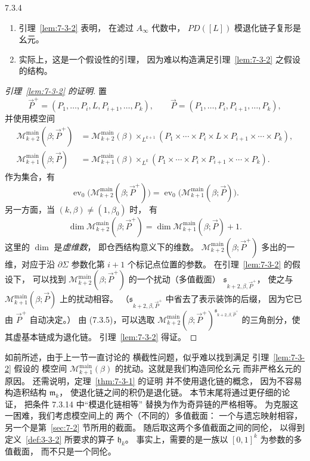 \begin{samepage}
\begin{remark}{7.3.4}\label{rem:7-3-4}
\begin{enumerate}[label=\textup{(\arabic*)},leftmargin=2.8em]
\item 引理~\ref{lem:7-3-2} 表明，
在滤过 $A_\infty$ 代数中，
$PD([L])$ 模退化链子复形是幺元。
\item 实际上，这是一个假设性的引理，
因为难以构造满足引理~\ref{lem:7-3-2}
之假设的结构。
\end{enumerate}
\end{remark}
\end{samepage}

\begin{proof}[引理~\ref{lem:7-3-2} 的证明]
置
\[
\vec P^+=(P_1,\ldots,P_i,L,P_{i+1},\ldots,P_k),
\qquad
\vec P=(P_1,\ldots,P_i,P_{i+1},\ldots,P_k),
\]
并使用模空间
\[
\begin{aligned}
\mathcal M^{\mathrm{main}}_{k+2}(\beta;\vec P^+)
&=\mathcal M^{\mathrm{main}}_{k+2}(\beta)
\mathbin{\times_{L^{k+1}}}
(P_1\times\cdots\times P_i\times L
\times P_{i+1}\times\cdots\times P_k),\\
\mathcal M^{\mathrm{main}}_{k+1}(\beta;\vec P)
&=\mathcal M^{\mathrm{main}}_{k+1}(\beta)
\mathbin{\times_{L^k}}
(P_1\times\cdots\times P_i
\times P_{i+1}\times\cdots\times P_k).
\end{aligned}
\]
作为集合，有
\[
\operatorname{ev}_0
\bigl(\mathcal M^{\mathrm{main}}_{k+2}
(\beta;\vec P^+)\bigr)
=\operatorname{ev}_0
\bigl(\mathcal M^{\mathrm{main}}_{k+1}
(\beta;\vec P)\bigr).
\]
另一方面，当 $(k,\beta)\ne(1,\beta_0)$ 时，
有
\begin{equation}
\dim\mathcal M^{\mathrm{main}}_{k+2}(\beta;\vec P^+)
=\dim\mathcal M^{\mathrm{main}}_{k+1}(\beta;\vec P)+1.
\tag{7.3.5}\label{eq:7-3-5}
\end{equation}
这里的 $\dim$ 是\emph{虚维数}，
即仓西结构意义下的维数。
$\mathcal M^{\mathrm{main}}_{k+2}(\beta;\vec P^+)$
多出的一维，对应于沿 $\partial\Sigma$
参数化第 $i+1$ 个标记点位置的参数。
在引理~\ref{lem:7-3-2} 的假设下，
可以找到
$\mathcal M^{\mathrm{main}}_{k+2}(\beta;\vec P^+)$
的一个扰动（多值截面）
$\mathfrak s_{k+2,\beta,\vec P^+}$，
使之与
$\mathcal M^{\mathrm{main}}_{k+1}(\beta;\vec P)$
上的扰动相容。
（$\mathfrak s_{k+2,\beta,\vec P^+}$
中省去了表示装饰的后缀，
因为它已由 $\vec P^+$ 自动决定。）
由 (7.3.5)，可以选取
$\mathcal M^{\mathrm{main}}_{k+2}
(\beta;\vec P^+)^{\mathfrak s_{k+2,\beta,\vec P^+}}$
的三角剖分，使其虚基本链成为退化链。
引理~\ref{lem:7-3-2} 得证。
\end{proof}

如前所述，由于上一节一直讨论的
横截性问题，似乎难以找到满足
引理~\ref{lem:7-3-2} 假设的
模空间 $\mathcal M^{\mathrm{main}}_{k+1}(\beta)$
的扰动。这就是我们构造同伦幺元
而非严格幺元的原因。
还需说明，定理~\ref{thm:7-3-1} 的证明
并不使用退化链的概念，
因为不容易构造积结构 $\mathfrak m_k$，
使退化链之间的积仍是退化链。
本节末尾将通过更仔细的论证，
把条件 7.3.14 中“模退化链相等”
替换为作为奇异链的严格相等。
为克服这一困难，我们考虑模空间上的
两个（不同的）多值截面：
一个与遗忘映射相容，
另一个是第~\ref{sec:7-2} 节所用的截面。
随后取这两个多值截面之间的同伦，
以得到定义~\ref{def:3-3-2}
所要求的算子 $\mathfrak h_k$。
事实上，需要的是一族以 $[0,1]^k$
为参数的多值截面，
而不只是一个同伦。
